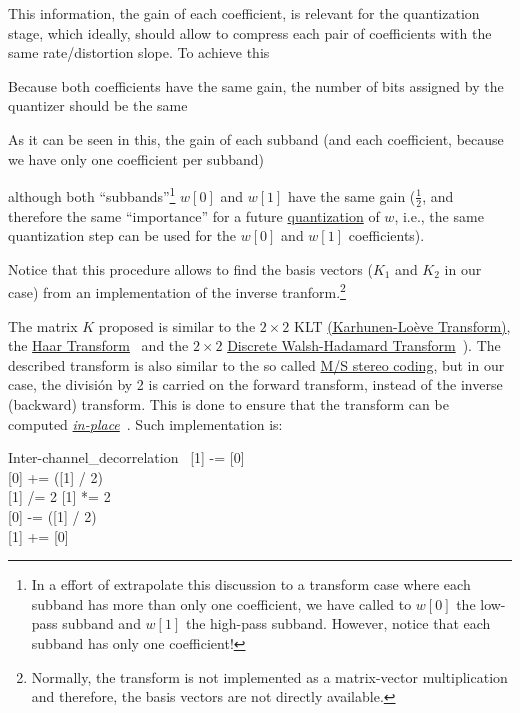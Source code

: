 This information, the gain of each coefficient, is relevant for the
quantization stage, which ideally, should allow to compress each pair
of coefficients with the same rate/distortion slope. To achieve this

Because both coefficients have the same gain, the number of bits assigned by the quantizer should be the same

As it can be seen in this, the gain of each subband (and each coefficient, because we have only one coefficient per subband)

although both ``subbands''\footnote{In a effort of extrapolate this
discussion to a transform case where each subband has more than only
one coefficient, we have called to $w[0]$ the low-pass subband and
$w[1]$ the high-pass subband. However, notice that each subband has
only one coefficient!} $w[0]$ and $w[1]$ have the same gain
($\frac{1}{2}$, and therefore the same ``importance'' for a
future
\href{https://en.wikipedia.org/wiki/Quantization_(signal_processing)}{quantization}
of $w$, i.e., the same quantization step can be used for the $w[0]$
and $w[1]$ coefficients).

Notice that this procedure allows to find the basis vectors ($K_1$ and
$K_2$ in our case) from an implementation of the inverse
tranform.\footnote{Normally, the transform is not implemented as a
matrix-vector multiplication and therefore, the basis vectors are not
directly available.}

The matrix $K$ proposed is similar to the $2\times 2$ KLT
\href{http://fourier.eng.hmc.edu/e161/lectures/klt/node3.html}{(Karhunen-Lo\`eve
  Transform)}, the
\href{http://wavelets.pybytes.com/wavelet/haar/}{Haar
  Transform}~\cite{vetterli1995wavelets} and the $2\times 2$
\href{https://en.wikipedia.org/wiki/Hadamard_transform}{Discrete
  Walsh-Hadamard Transform}~\cite{sayood2017introduction}).  The
described transform is also similar to the so called
\href{https://en.wikipedia.org/wiki/Joint_encoding#M/S_stereo_coding}{M/S
  stereo coding}, but in our case, the división by 2 is carried on the
forward transform, instead of the inverse (backward) transform. This
is done to ensure that the transform can be computed
\href{https://en.wikipedia.org/wiki/In-place_algorithm}{\emph{in-place}}~\cite{2006.sweldens}. Such
implementation is:

\begin{pseudocode}{Inter-channel\_decorrelation}{~}
  \BEGIN
    [1] -= [0] \\
    [0] += ([1] / 2) \\
    [1] /= 2
  \END
  \ENDPROCEDURE
  \BEGIN
    [1] *= 2 \\
    [0] -= ([1] / 2) \\
    [1] += [0]
  \END
  \ENDPROCEDURE
\end{pseudocode}

